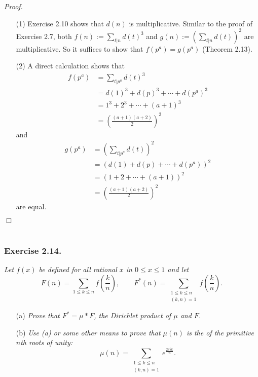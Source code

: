 \documentclass{article}
\begin{document}
\emph{Proof.}
\begin{enumerate}
\item[(1)]
  Exercise 2.10 shows that $d(n)$ is multiplicative.
  Similar to the proof of Exercise 2.7,
  both $f(n) := \sum_{t|n} d(t)^3$ and $g(n) := \left(\sum_{t|n} d(t)\right)^2$
  are multiplicative.
  So it suffices to show that $f(p^a) = g(p^a)$ (Theorem 2.13).

\item[(2)]
  A direct calculation shows that
  \begin{align*}
    f(p^a)
    &= \sum_{t|p^a} d(t)^3 \\
    &= d(1)^3 + d(p)^3 + \cdots + d(p^a)^3 \\
    &= 1^3 + 2^3 + \cdots + (a+1)^3 \\
    &= \left( \frac{(a+1)(a+2)}{2} \right)^2
  \end{align*}
  and
  \begin{align*}
    g(p^a)
    &= \left( \sum_{t|p^a} d(t) \right)^2 \\
    &= (d(1) + d(p) + \cdots + d(p^a))^2 \\
    &= (1 + 2 + \cdots + (a+1))^2 \\
    &= \left( \frac{(a+1)(a+2)}{2} \right)^2
  \end{align*}
  are equal.
\end{enumerate}
$\Box$ \\\\









\subsubsection*{Exercise 2.14.}
\emph{Let $f(x)$ be defined for all rational $x$ in $0 \leq x \leq 1$ and let
\[
  F(n) = \sum_{1 \leq k \leq n} f\left( \frac{k}{n} \right),
  \qquad
  F^{*}(n) = \sum_{\substack{1 \leq k \leq n \\ (k,n)=1}} f\left( \frac{k}{n} \right).  
\]}
\begin{enumerate}
\item[(a)]
  \emph{Prove that $F^{*} = \mu * F$, the Dirichlet product of $\mu$ and $F$.}

\item[(b)]
  \emph{Use (a) or some other means to prove that $\mu(n)$ is the of the primitive $n$th
  roots of unity:}
  \[
    \mu(n) = \sum_{\substack{1 \leq k \leq n \\ (k,n)=1}} e^{\frac{2\pi i k}{n}}.
  \] \\
\end{enumerate}
\end{document}
